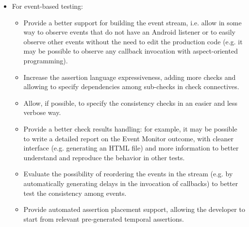 \documentclass[11pt,a4paper,notitlepage]{article}
\begin{document}
\begin{itemize}
	\item For event-based testing:
	\begin{itemize}
		\item Provide a better support for building the event stream, i.e. allow in some way to observe events that do not have an Android listener or to easily observe other events without the need to edit the production code (e.g. it may be possible to observe any callback invocation with aspect-oriented programming).
		\item Increase the assertion language expressiveness, adding more checks and allowing to specify dependencies among sub-checks in check connectives.
		\item Allow, if possible, to specify the consistency checks in an easier and less verbose way.
		\item Provide a better check results handling: for example, it may be possible to write a detailed report on the Event Monitor outcome, with cleaner interface (e.g. generating an HTML file) and more information to better understand and reproduce the behavior in other tests.
		\item Evaluate the possibility of reordering the events in the stream (e.g. by automatically generating delays in the invocation of callbacks) to better test the consistency among events.
		\item Provide automated assertion placement support, allowing the developer to start from relevant pre-generated temporal assertions.
	\end{itemize}
\end{itemize}


\end{document}

